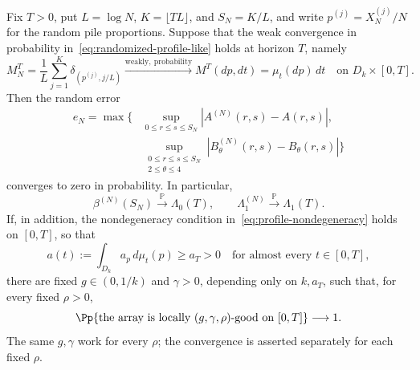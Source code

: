 \begin{lemma}
\label{lem:random-profile-bridge}
Fix $T>0$, put $L=\log N$, $K=\lfloor TL\rfloor$, and
$S_N=K/L$, and write $p^{(j)}=X_N^{(j)}/N$ for the random pile
proportions. Suppose that the weak convergence in probability
in~\eqref{eq:randomized-profile-like} holds at horizon $T$, namely
\[
 M_N^T=\frac1L\sum_{j=1}^K\delta_{(p^{(j)},j/L)}
 \xrightarrow{\mathrm{weakly,\ probability}}
 M^T(dp,dt)=\mu_t(dp)\,dt
 \quad\text{on }D_k\times[0,T].
\]
Then the random error
\begin{align*}
 e_N=\max\bigg\{&
 \sup_{0\le r\le s\le S_N}|A^{(N)}(r,s)-A(r,s)|,\\
 &\sup_{\substack{0\le r\le s\le S_N\\2\le\theta\le4}}
       |B_\theta^{(N)}(r,s)-B_\theta(r,s)|\bigg\}
\end{align*}
converges to zero in probability. In particular,
\begin{equation}\label{eq:random-profile-margin-convergence}
 \beta^{(N)}(S_N)\xrightarrow{\mathbb P}\Lambda_0(T),
 \qquad
 \Lambda_1^{(N)}\xrightarrow{\mathbb P}\Lambda_1(T).
\end{equation}
If, in addition, the nondegeneracy condition
in~\eqref{eq:profile-nondegeneracy} holds on $[0,T]$, so that
\[
 a(t):=\int_{D_k}a_p\,d\mu_t(p)\ge a_T>0
 \quad\text{for almost every }t\in[0,T],
\]
there are fixed $g\in(0,1/k)$ and $\gamma>0$, depending only on
$k,a_T$, such that, for every fixed $\rho>0$,
\begin{equation}\label{eq:random-profile-local-good}
 \Pp\{\text{the array is locally }(g,\gamma,\rho)
                  \text{-good on }[0,T]\}\longrightarrow1.
\end{equation}
The same $g,\gamma$ work for every $\rho$; the convergence is asserted
separately for each fixed $\rho$.
\end{lemma}

